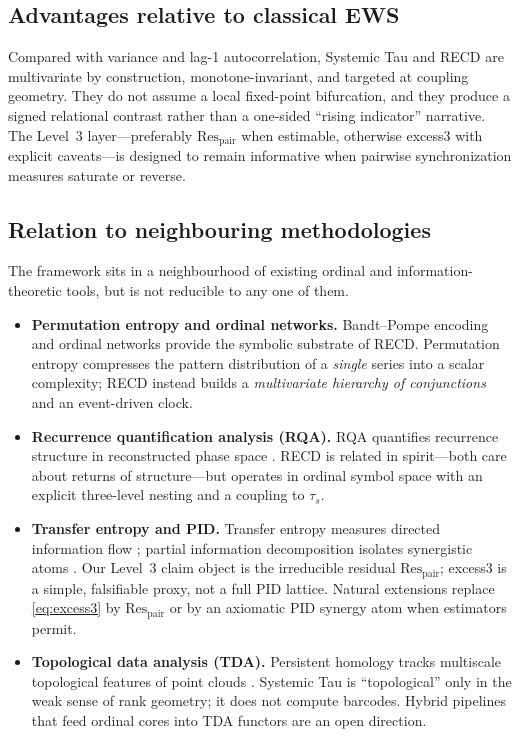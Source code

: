 \documentclass[11pt,a4paper]{article}
\begin{document}
\subsection{Advantages relative to classical EWS}

Compared with variance and lag-1 autocorrelation, Systemic Tau and RECD
are multivariate by construction, monotone-invariant, and targeted at
coupling geometry. They do not assume a local fixed-point bifurcation,
and they produce a signed relational contrast rather than a one-sided
``rising indicator'' narrative. The Level~3 layer---preferably
$\mathrm{Res}_{\mathrm{pair}}$ when estimable, otherwise excess3 with
explicit caveats---is designed to remain informative when pairwise
synchronization measures saturate or reverse.

\subsection{Relation to neighbouring methodologies}

The framework sits in a neighbourhood of existing ordinal and
information-theoretic tools, but is not reducible to any one of them.

\begin{itemize}[leftmargin=*,itemsep=3pt]
  \item \textbf{Permutation entropy and ordinal networks.}
  Bandt--Pompe encoding and ordinal networks
  \cite{BandtPompe2002,Amigo2010,McCullough2015} provide the symbolic
  substrate of RECD. Permutation entropy compresses the pattern
  distribution of a \emph{single} series into a scalar complexity;
  RECD instead builds a \emph{multivariate hierarchy of conjunctions}
  and an event-driven clock.

  \item \textbf{Recurrence quantification analysis (RQA).}
  RQA quantifies recurrence structure in reconstructed phase space
  \cite{Marwan2007}. RECD is related in spirit---both care about
  returns of structure---but operates in ordinal symbol space with an
  explicit three-level nesting and a coupling to $\tau_s$.

  \item \textbf{Transfer entropy and PID.}
  Transfer entropy measures directed information flow
  \cite{Schreiber2000}; partial information decomposition isolates
  synergistic atoms \cite{Williams2010,Lizier2014}. Our Level~3 claim
  object is the irreducible residual $\mathrm{Res}_{\mathrm{pair}}$;
  excess3 is a simple, falsifiable proxy, not a full PID lattice.
  Natural extensions replace \eqref{eq:excess3} by
  $\mathrm{Res}_{\mathrm{pair}}$ or by an axiomatic PID synergy atom when
  estimators permit.

  \item \textbf{Topological data analysis (TDA).}
  Persistent homology tracks multiscale topological features of point
  clouds \cite{Carlsson2009}. Systemic Tau is ``topological'' only in
  the weak sense of rank geometry; it does not compute barcodes. Hybrid
  pipelines that feed ordinal cores into TDA functors are an open
  direction.
\end{itemize}
\end{document}
